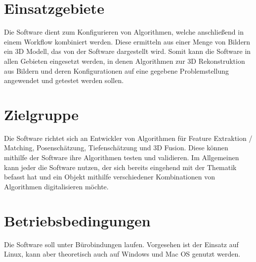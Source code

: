\section{Einsatzgebiete}
Die Software dient zum Konfigurieren von Algorithmen, welche anschließend in einem Workflow kombiniert werden. Diese ermitteln aus einer Menge von Bildern ein 3D Modell, das von der Software dargestellt wird. Somit kann die Software in allen Gebieten eingesetzt werden, in denen Algorithmen zur 3D Rekonstruktion aus Bildern und deren Konfigurationen auf eine gegebene Problemstellung angewendet und getestet werden sollen. 
\section{Zielgruppe}
Die Software richtet sich an Entwickler von Algorithmen für Feature Extraktion / Matching, Posenschätzung, Tiefenschätzung und 3D Fusion. Diese können mithilfe der Software ihre Algorithmen testen und validieren. Im Allgemeinen kann jeder die Software nutzen, der sich bereits eingehend mit der Thematik befasst hat und ein Objekt mithilfe verschiedener Kombinationen von Algorithmen digitalisieren möchte.
\section{Betriebsbedingungen} 
Die Software soll unter Bürobindungen laufen. Vorgesehen ist der Einsatz auf Linux, kann aber theoretisch auch auf Windows und Mac OS genutzt werden. 
